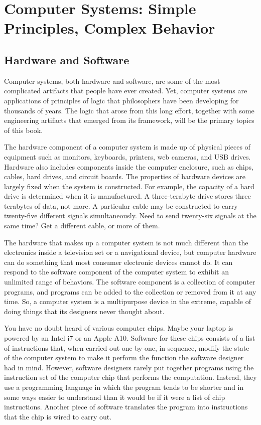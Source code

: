 \chapter[Computer Systems: Simple Principles Lead to Complex Behavior]{Computer Systems: Simple Principles, Complex Behavior}


\section{Hardware and Software}

Computer systems, both hardware and software, are some of the
most complicated artifacts that people have ever created.
Yet, computer systems are
applications of principles of logic that philosophers
have been developing for thousands of years.
The logic that arose from this long effort,
together with some engineering artifacts
that emerged from its framework,
will be the primary topics of this book.

The hardware component of a computer system is made up
of physical pieces of equipment such as monitors,
keyboards, printers, web cameras, and USB drives.
Hardware also includes components inside the computer enclosure,
such as chips, cables, hard drives, and circuit boards.
The properties of hardware devices are largely fixed when the system is
constructed. For example, the capacity of a hard drive is
determined when it is manufactured. A three-terabyte drive
stores three terabytes of data, not more.
A particular cable may be constructed to carry twenty-five different signals
simultaneously. Need to send twenty-six signals at the same time?
Get a different cable, or more of them.

The hardware that makes up a computer system is not much different
than the electronics inside a television set or a navigational device,
but computer hardware can do something that most
consumer electronic devices cannot do.
It can respond to the software component of the computer system
to exhibit an unlimited range of behaviors.
The software component is a collection of computer programs,
and programs can be added to the collection or removed from it
at any time.
So, a computer system is a multipurpose device in the extreme,
capable of doing things that its designers never thought about.

You have no doubt heard of various computer chips.
Maybe your laptop is powered by an Intel i7 or
an Apple A10.
Software for these chips consists of a list of
instructions that, when carried out one by one, in sequence,
modify the state of the computer system to make it perform
the function the software designer had in mind.
However, software designers rarely put together programs using
the instruction set of the computer chip
that performs the computation.
Instead, they use a programming language in which
the program tends to be shorter and
in some ways easier to understand than it would
be if it were a list of chip instructions.
Another piece of software
translates the program into instructions that the
chip is wired to carry out.

